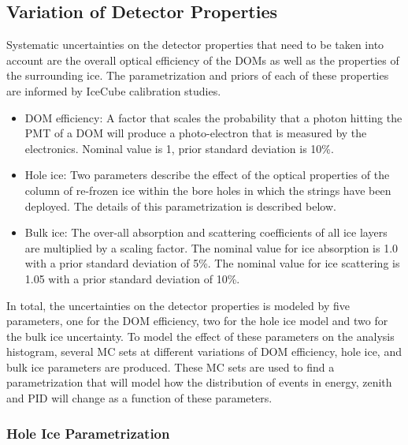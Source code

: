 \subsection{Variation of Detector Properties}
\label{sec:detector-unc}
Systematic uncertainties on the detector properties that need to be taken into account are the overall optical efficiency of the DOMs as well as the properties of the surrounding ice. The parametrization and priors of each of these properties are informed by IceCube calibration studies. 
\begin{itemize}
    \item DOM efficiency: A factor that scales the probability that a photon hitting the PMT of a DOM will produce a photo-electron that is measured by the electronics. Nominal value is 1, prior standard deviation is 10\%.
    \item Hole ice: Two parameters describe the effect of the optical properties of the column of re-frozen ice within the bore holes in which the strings have been deployed. The details of this parametrization is described below.
    \item Bulk ice: The over-all absorption and scattering coefficients of all ice layers are multiplied by a scaling factor. The nominal value for ice absorption is 1.0 with a prior standard deviation of 5\%. The nominal value for ice scattering is 1.05 with a prior standard deviation of 10\%.
\end{itemize}

In total, the uncertainties on the detector properties is modeled by five  parameters, one for the DOM efficiency, two for the hole ice model and two for the bulk ice uncertainty. To model the effect of these parameters on the analysis histogram, several MC sets at different variations of DOM efficiency, hole ice, and bulk ice parameters are produced. These MC sets are used to find a parametrization that will model how the distribution of events in energy, zenith and PID will change as a function of these parameters.

\subsubsection{Hole Ice Parametrization}
\label{sec:hole-ice-parametrization}

